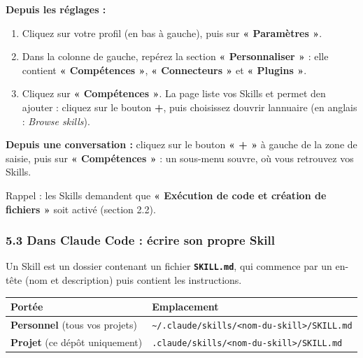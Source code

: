 \documentclass[
  french,
  11pt,
  a4paper,
]{article}
\providecommand{\tightlist}{%
  \setlength{\itemsep}{0pt}\setlength{\parskip}{0pt}}
\begin{document}
\textbf{Depuis les réglages :}

\begin{enumerate}
\def\labelenumi{\arabic{enumi}.}
\tightlist
\item
  Cliquez sur votre profil (en bas à gauche), puis sur \textbf{«
  Paramètres »}.
\item
  Dans la colonne de gauche, repérez la section \textbf{« Personnaliser
  »} : elle contient \textbf{« Compétences »}, \textbf{« Connecteurs »}
  et \textbf{« Plugins »}.
\item
  Cliquez sur \textbf{« Compétences »}. La page liste vos Skills et
  permet d\textquotesingle en ajouter : cliquez sur le bouton
  \textbf{+}, puis choisissez d\textquotesingle ouvrir
  l\textquotesingle annuaire (en anglais : \emph{Browse skills}).
\end{enumerate}

\textbf{Depuis une conversation :} cliquez sur le bouton \textbf{« + »}
à gauche de la zone de saisie, puis sur \textbf{« Compétences »} : un
sous-menu s\textquotesingle ouvre, où vous retrouvez vos Skills.

Rappel : les Skills demandent que \textbf{« Exécution de code et
création de fichiers »} soit activé (section 2.2).

\subsubsection{5.3 Dans Claude Code : écrire son propre
Skill}\label{53-dans-claude-code--uxe9crire-son-propre-skill}

Un Skill est un dossier contenant un fichier \textbf{\texttt{SKILL.md}},
qui commence par un en-tête (nom et description) puis contient les
instructions.

\begin{longtable}[]{@{}
  >{\raggedright\arraybackslash}p{}
  >{\raggedright\arraybackslash}p{}@{}}
\toprule\noalign{}
\begin{minipage}[b]{\linewidth}\raggedright
Portée
\end{minipage} & \begin{minipage}[b]{\linewidth}\raggedright
Emplacement
\end{minipage} \\
\midrule\noalign{}
\endhead
\bottomrule\noalign{}
\endlastfoot
\textbf{Personnel} (tous vos projets) &
\texttt{\textasciitilde{}/.claude/skills/\textless{}nom-du-skill\textgreater{}/SKILL.md} \\
\textbf{Projet} (ce dépôt uniquement) &
\texttt{.claude/skills/\textless{}nom-du-skill\textgreater{}/SKILL.md} \\
\end{longtable}
\end{document}
